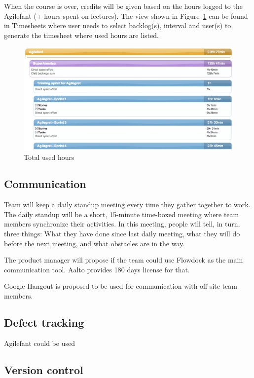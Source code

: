 \documentclass{report}
\begin{document}
When the course is over, credits will be given based on the hours logged to the Agilefant (+ hours spent on lectures). The view shown in Figure~\ref{fig:totalhours} can be found in Timesheets where user needs to select backlog(s), interval and user(s) to generate the timesheet where used hours are listed.

\begin{figure}[H]
\centering
\includegraphics[width=1\textwidth]{imgs/totalhours.png}
\caption{Total used hours}
\label{fig:totalhours}
\end{figure}

\subsection{Communication}

Team will keep a daily standup meeting every time they gather together to work. The daily standup will be a short, 15-minute time-boxed meeting where team members synchronize their activities. In this meeting, people will tell, in turn, three things: What they have done since last daily meeting, what they will do before the next meeting, and what obstacles are in the way.  

The product manager will propose if the team could use Flowdock as the main communication tool. Aalto provides 180 days license for that.

Google Hangout is proposed to be used for communication with off-site team members.

\subsection{Defect tracking}

Agilefant could be used

\subsection{Version control}
\end{document}
